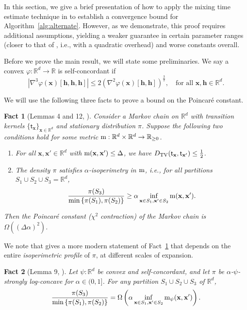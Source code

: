 \documentclass[11pt]{article}
\newtheorem{fact}{Fact}
\newcommand{\R}{\mathbb{R}}
\newcommand{\Par}[1]{\left(#1\right)}
\newcommand{\Brace}[1]{\left\{#1\right\}}
\newcommand{\0}{\mathbf{0}}
\newcommand{\1}{\mathbf{1}}
\newcommand{\vh}{\mathbf{h}}
\newcommand{\vx}{\mathbf{x}}
\newcommand{\vhi}{\varphi}
\begin{document}
In this section, we give a brief presentation of how to apply the mixing time estimate technique in \cite{GopiLLST25} to establish a convergence bound for Algorithm~\ref{alg:alternate}.  However, as we demonstrate, this proof requires additional assumptions, yielding a weaker guarantee in certain parameter ranges (closer to that of \cite{GopiLLST25}, i.e., with a quadratic overhead) and worse constants overall.

Before we prove the main result, we will state some preliminaries. We say a convex $\vhi:\R^d\to\R$ is self-concordant if \[
|\nabla^3\vhi(\vx)[\vh,\vh,\vh]|\le 2(\nabla^2\vhi(\vx)[\vh,\vh])^{\frac32}, \quad\text{for all }\vx,\vh\in\R^d.
\]

We will use the following three facts to prove a bound on the Poincar\'e constant. 
\begin{fact}[Lemmas 4 and 12, \cite{ChenDWY20}]\label{fact:old_school_pi_bound}
Consider a Markov chain on $\R^d$ with transition kernels $\{\mathsf{t}_{\vx}\}_{\vx\in\mathbb{R}^d}$ and stationary distribution $\pi$. Suppose the following two conditions hold for some metric $\textup{m}: \R^d \times \R^d \to \R_{\ge 0}$.
\begin{enumerate}
    \item For all $\vx, \vx' \in \R^d$ with $\textup{m}(\vx, \vx') \le \Delta$, we have $D_{\textup{TV}}(\mathsf{t}_{\vx}, \mathsf{t}_{\vx'}) \le \frac 1 2$.
    \item The density $\pi$ satisfies $\alpha$-isoperimetry in $\textup{m}$, i.e., for all partitions $S_1 \cup S_2 \cup S_3 = \R^d$,
    \[\frac{\pi(S_3)}{\min\Brace{\pi(S_1), \pi(S_2)}} \ge \alpha \inf_{\vx \in S_1, \vx' \in S_2}\textup{m}(\vx, \vx').\]
\end{enumerate}
Then the Poincar\'e constant ($\chi^2$ contraction) of the Markov chain is $\Omega((\Delta \alpha)^2)$.
\end{fact}

We note that \cite{ChenDWY20} gives a more modern statement of Fact~\ref{fact:old_school_pi_bound} that depends on the entire \emph{isoperimetric profile} of $\pi$, at different scales of expansion.


\begin{fact}[Lemma 9, \cite{GopiLLST25}]\label{fact:lem9_gllst}
    Let $\psi:\R^d$ be convex and self-concordant, and let  $\pi$ be $\alpha$-$\psi$-strongly log-concave for $\alpha\in(0,1]$. For any partition $S_1\cup S_2\cup S_3$ of $\R^d$, \[
    \frac{\pi(S_3)}{\min\Brace{\pi(S_1), \pi(S_2)}} = \Omega\Par{\alpha\inf_{\vx\in S_1,\vx'\in S_2}\textup{m}_\psi(\vx,\vx')}.
    \]
\end{fact}
\end{document}
